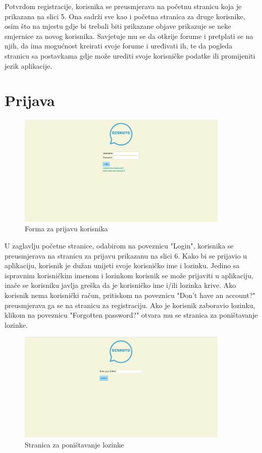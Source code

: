 \documentclass{foi}
\begin{document}
Potvrdom registracije, korisnika se preusmjerava na početnu stranicu koja je prikazana na slici 5. Ona sadrži sve kao i početna stranica za druge korisnike, osim što na mjestu gdje bi trebali biti prikazane objave prikazuje se neke smjernice za novog korisnika. Savjetuje mu se da otkrije forume i pretplati se na njih, da ima mogućnost kreirati svoje forume i uređivati ih, te da pogleda stranicu sa postavkama gdje može urediti svoje korisničke podatke ili promijeniti jezik aplikacije.

\section{Prijava}

\begin{figure}[h!]
    \centering
    \includegraphics[width=0.9\textwidth]{slike/prijava.png}
    \caption{Forma za prijavu korisnika}
\end{figure}

U zaglavlju početne stranice, odabirom na poveznicu "Login", korisnika se preusmjerava na stranicu za prijavu prikazanu na slici 6. Kako bi se prijavio u aplikaciju, korisnik je dužan unijeti svoje korisničko ime i lozinku. Jedino sa ispravnim korisničkim imenom i lozinkom korisnik se može prijaviti u aplikaciju, inače se korisniku javlja greška da je korisničko ime i/ili lozinka krive. Ako korisnik nema korisnički račun, pritiskom na poveznicu "Don't have an account?" preusmjerava ga se na stranicu za registraciju. Ako je korisnik zaboravio lozinku, klikom na poveznicu "Forgotten password?" otvara mu se stranica za poništavanje lozinke.

\begin{figure}[h!]
    \centering
    \includegraphics[width=0.9\textwidth]{slike/zaboravljena-lozinka.png}
    \caption{Stranica za poništavanje lozinke}
\end{figure}
\end{document}
